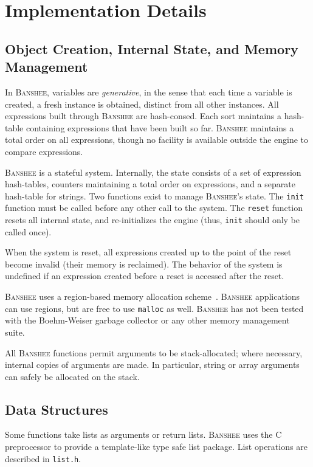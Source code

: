 \documentclass{article}
\newcommand{\banshee}{\textsc{Banshee}}
\begin{document}
\section{Implementation Details}

\subsection{Object Creation, Internal State, and Memory Management}

In \banshee{}, variables are \emph{generative}, in the sense 
that each time a variable is created, a fresh instance is obtained, 
distinct from all other instances. All expressions built through \banshee{} are hash-consed. Each sort maintains a hash-table containing expressions that have been built so far. \banshee{} maintains a total order on all expressions, though no facility is available outside the engine to compare expressions.

\banshee{} is a stateful system. Internally, the state consists of a set of 
expression hash-tables, counters maintaining a total order on expressions, 
and a separate hash-table for strings. Two functions exist to manage \banshee{}'s state. The \texttt{init} function must be called before any other call to the system. The \texttt{reset} function resets all internal state, and re-initializes the engine (thus, \texttt{init} should only be called once).

When the system is reset, all expressions created up to the point of the reset 
become invalid (their memory is reclaimed). The behavior of the system is 
undefined if an expression created before a reset is accessed after the reset.

\banshee{} uses a region-based memory allocation scheme~\cite{gay:pldi01}. 
\banshee{} applications can use regions, but are free to use 
\texttt{malloc} as well. \banshee{} has not been tested with the Boehm-Weiser
garbage collector or any other memory management suite.

All \banshee{} functions permit arguments to be stack-allocated; where 
necessary, internal copies of arguments are made. In particular, string or 
array arguments can safely be allocated on the stack.

\subsection{Data Structures}

Some functions take lists as arguments or return lists. \banshee{}
uses the C preprocessor to provide a template-like type safe list package. 
List operations are described in \texttt{list.h}.
\end{document}
